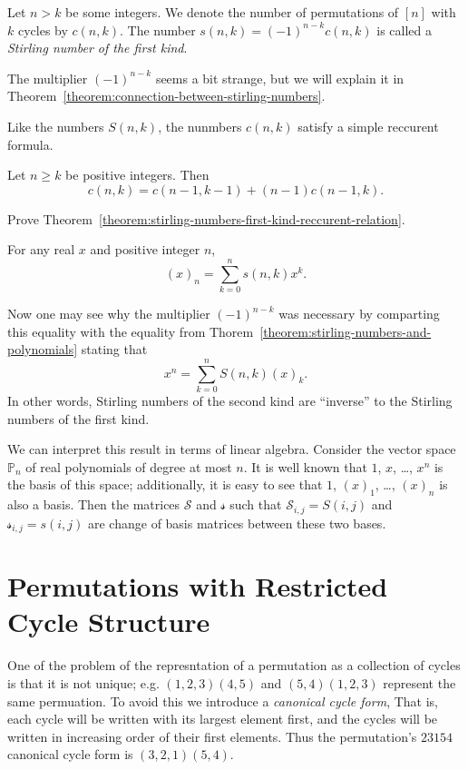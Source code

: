 \begin{definition}
  Let $n > k$ be some integers. We denote the number of permutations of $[n]$
  with $k$ cycles by $c(n, k)$. The number $s(n, k) = (-1)^{n - k} c(n, k)$ is
  called a \emph{Stirling number of the first kind}.
\end{definition}
The multiplier $(-1)^{n - k}$ seems a bit strange, but we will explain it
in Theorem~\ref{theorem:connection-between-stirling-numbers}.

Like the numbers $S(n, k)$, the nunmbers $c(n, k)$ satisfy a simple reccurent
formula.
\begin{theorem}
\label{theorem:stirling-numbers-first-kind-reccurent-relation}
  Let $n \ge k$ be positive integers. Then
  \[
    c(n, k) = c(n - 1, k - 1) + (n - 1) c(n - 1, k).
  \]
\end{theorem}

\begin{exercise}
  Prove Theorem~\ref{theorem:stirling-numbers-first-kind-reccurent-relation}.
\end{exercise}

\begin{theorem}
\label{theorem:connection-between-stirling-numbers}
  For any real $x$ and positive integer $n$,
  \[
    (x)_n = \sum_{k = 0}^n s(n, k) x^k.
  \]
\end{theorem}
Now one may see why the multiplier $(-1)^{n - k}$ was necessary by comparting
this equality with the equality from
Thorem~\ref{theorem:stirling-numbers-and-polynomials} stating that
\[
  x^n = \sum_{k = 0}^n S(n, k) (x)_k.
\]
In other words, Stirling numbers of the second kind are ``inverse'' to the
Stirling numbers of the first kind.

We can interpret this result in terms of linear algebra. Consider the vector
space $\mathbb{P}_n$ of real polynomials of degree at most $n$. It is well
known that $1$, $x$, \dots, $x^n$ is the basis of this space; additionally,
it is easy to see that $1$, $(x)_1$, \dots, $(x)_n$ is also a basis. Then
the matrices $\mathcal{S}$ and $\mathcal{s}$ such that
$\mathcal{S}_{i, j} = S(i, j)$ and $\mathcal{s}_{i, j} = s(i, j)$ are
change of basis matrices between these two bases.

\section{Permutations with Restricted Cycle Structure}
One of the problem of the represntation of a permutation as a collection of
cycles is that it is not unique; e.g. $(1, 2, 3) (4, 5)$ and $(5, 4) (1, 2, 3)$
represent the same permuation. To avoid this we introduce a \emph{canonical
cycle form}, That is, each cycle will be written with its largest element first,
and the cycles will be written in increasing order of their first elements. Thus
the permutation's $2 3 1 5 4$ canonical cycle form is $(3, 2, 1) (5, 4)$.

